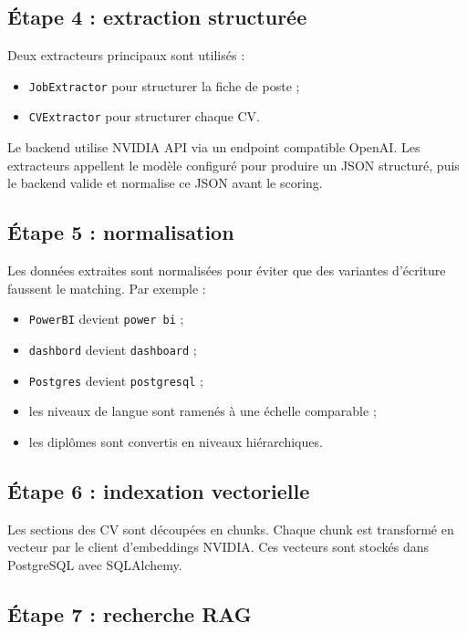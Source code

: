 \documentclass[12pt,a4paper]{report}
\begin{document}
\subsection{Étape 4 : extraction structurée}

Deux extracteurs principaux sont utilisés :

\begin{itemize}
    \item \texttt{JobExtractor} pour structurer la fiche de poste ;
    \item \texttt{CVExtractor} pour structurer chaque CV.
\end{itemize}

Le backend utilise NVIDIA API via un endpoint compatible OpenAI. Les extracteurs appellent le modèle configuré pour produire un JSON structuré, puis le backend valide et normalise ce JSON avant le scoring.

\subsection{Étape 5 : normalisation}

Les données extraites sont normalisées pour éviter que des variantes d'écriture faussent le matching. Par exemple :

\begin{itemize}
    \item \texttt{PowerBI} devient \texttt{power bi} ;
    \item \texttt{dashbord} devient \texttt{dashboard} ;
    \item \texttt{Postgres} devient \texttt{postgresql} ;
    \item les niveaux de langue sont ramenés à une échelle comparable ;
    \item les diplômes sont convertis en niveaux hiérarchiques.
\end{itemize}

\subsection{Étape 6 : indexation vectorielle}

Les sections des CV sont découpées en chunks. Chaque chunk est transformé en vecteur par le client d'embeddings NVIDIA. Ces vecteurs sont stockés dans PostgreSQL avec SQLAlchemy.

\subsection{Étape 7 : recherche RAG}
\end{document}
